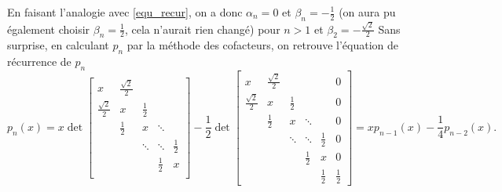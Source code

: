 En faisant l'analogie avec \eqref{equ_recur},
on a donc $\alpha_n = 0$ et $\beta_n = -\frac{1}{2}$
(on aura pu également choisir $\beta_n = \frac{1}{2}$,
cela n'aurait rien changé) pour $n > 1$ et $\beta_2 = -\frac{\sqrt{2}}{2}$
Sans surprise, en calculant $p_n$ par la méthode des cofacteurs, on retrouve l'équation de récurrence de $p_n$
$$
p_n(x) = x \det
\left[
\begin{array}{ccccc}
  x & \frac{\sqrt{2}}{2} & & &  \\
  \frac{\sqrt{2}}{2} & x & \frac 12 & & \\
 & \frac 12 & x & \ddots & \\
 & & \ddots & \ddots & \frac 12  \\
 & & & \frac 12 & x   \\
\end{array}
\right] - \frac 12\det
\left[
\begin{array}{cccccc}
  x & \frac{\sqrt{2}}{2} & & & & 0 \\
  \frac{\sqrt{2}}{2} & x & \frac 12 & & & 0\\
 & \frac 12 & x & \ddots & & 0\\
 & & \ddots & \ddots & \frac 12 & 0\\
 & & & \frac 12 & x &  0\\
 & & & &  \frac 12 &  \frac 12
\end{array}
\right] = xp_{n-1}(x)-\frac{1}{4}p_{n-2}(x).
$$


